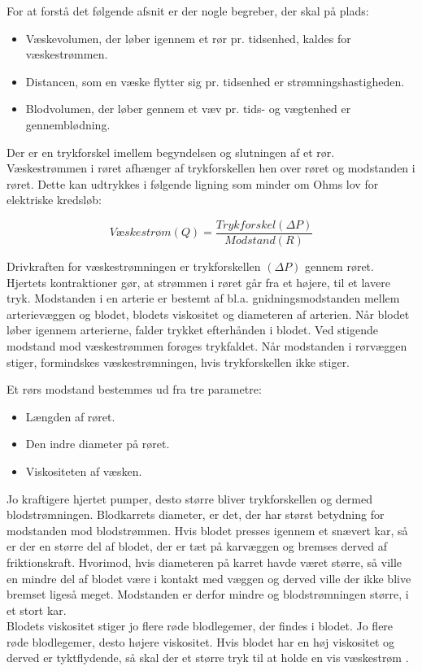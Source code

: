 For at forstå det følgende afsnit er der nogle begreber, der skal på plads: 
\begin{itemize}
\item Væskevolumen, der løber igennem et rør pr. tidsenhed, kaldes for væskestrømmen.
\item Distancen, som en væske flytter sig pr. tidsenhed er strømningshastigheden.
\item Blodvolumen, der løber gennem et væv pr. tids- og vægtenhed er gennemblødning.
\end{itemize}

Der er en trykforskel imellem begyndelsen og slutningen af et rør. Væskestrømmen i røret afhænger af trykforskellen hen over røret og modstanden i røret. Dette kan udtrykkes i følgende ligning som minder om Ohms lov for elektriske kredsløb:  

$$ Væskestrøm(Q)= \frac{Trykforskel(\Delta P)}{Modstand(R)}$$

Drivkraften for væskestrømningen er trykforskellen $(\Delta P)$ gennem røret. Hjertets kontraktioner gør, at strømmen i røret går fra et højere, til et lavere tryk. 
Modstanden i en arterie er bestemt af bl.a. gnidningsmodstanden mellem arterievæggen og blodet, blodets viskositet og diameteren af arterien. Når blodet løber igennem arterierne, falder trykket efterhånden i blodet. Ved stigende modstand mod væskestrømmen forøges trykfaldet. 
Når modstanden i rørvæggen stiger, formindskes væskestrømningen, hvis trykforskellen ikke stiger.

Et rørs modstand bestemmes ud fra tre parametre: 

\begin{itemize}
\item Længden af røret.
\item Den indre diameter på røret. 
\item Viskositeten af væsken.
\end{itemize}

Jo kraftigere hjertet pumper, desto større bliver trykforskellen og dermed blodstrømningen. 
Blodkarrets diameter, er det, der har størst betydning for modstanden mod blodstrømmen. Hvis blodet presses igennem et snævert kar, så er der en større del af blodet, der er tæt på karvæggen og bremses derved af friktionskraft. Hvorimod, hvis diameteren på karret havde været større, så ville en mindre del af blodet være i kontakt med væggen og derved ville der ikke blive bremset ligeså meget. Modstanden er derfor mindre og blodstrømningen større, i et stort kar. \\
Blodets viskositet stiger jo flere røde blodlegemer, der findes i blodet. Jo flere røde blodlegemer, desto højere viskositet. Hvis blodet har en høj viskositet og derved er tyktflydende, så skal der et større tryk til at holde en vis væskestrøm \citep{Blodtryk}. 
   
